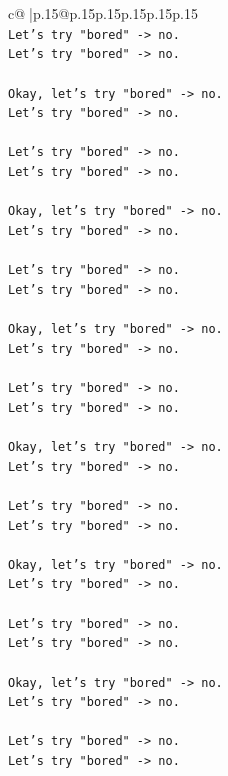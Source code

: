 \documentclass{article}
\begin{document}
{\begin{supertabular}{c@{$\;$}|p{.15\linewidth}@{}p{.15\linewidth}p{.15\linewidth}p{.15\linewidth}p{.15\linewidth}p{.15\linewidth}}
{{{\\ 
\texttt{Let's try "bored" {-}> no.} \\
\texttt{Let's try "bored" {-}> no.} \\
\\ 
\texttt{Okay, let's try "bored" {-}> no.} \\
\texttt{Let's try "bored" {-}> no.} \\
\\ 
\texttt{Let's try "bored" {-}> no.} \\
\texttt{Let's try "bored" {-}> no.} \\
\\ 
\texttt{Okay, let's try "bored" {-}> no.} \\
\texttt{Let's try "bored" {-}> no.} \\
\\ 
\texttt{Let's try "bored" {-}> no.} \\
\texttt{Let's try "bored" {-}> no.} \\
\\ 
\texttt{Okay, let's try "bored" {-}> no.} \\
\texttt{Let's try "bored" {-}> no.} \\
\\ 
\texttt{Let's try "bored" {-}> no.} \\
\texttt{Let's try "bored" {-}> no.} \\
\\ 
\texttt{Okay, let's try "bored" {-}> no.} \\
\texttt{Let's try "bored" {-}> no.} \\
\\ 
\texttt{Let's try "bored" {-}> no.} \\
\texttt{Let's try "bored" {-}> no.} \\
\\ 
\texttt{Okay, let's try "bored" {-}> no.} \\
\texttt{Let's try "bored" {-}> no.} \\
\\ 
\texttt{Let's try "bored" {-}> no.} \\
\texttt{Let's try "bored" {-}> no.} \\
\\ 
\texttt{Okay, let's try "bored" {-}> no.} \\
\texttt{Let's try "bored" {-}> no.} \\
\\ 
\texttt{Let's try "bored" {-}> no.} \\
\texttt{Let's try "bored" {-}> no.} \\
}}}
\end{supertabular}}
\end{document}
